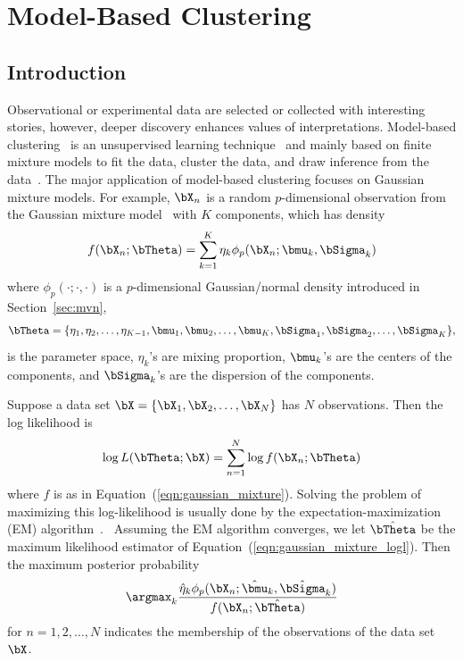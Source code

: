 
\chapter{Model-Based Clustering}
\label{chp:pmclust}




\section{Introduction}

Observational or experimental data are selected or collected with
interesting stories, however, deeper discovery enhances values of
interpretations.
Model-based clustering~
is an unsupervised learning technique~
and mainly based on finite mixture models to fit the data, cluster the data,
and draw inference from the data~\citep{Fraley2002,Melnykov2010}.
The major application of
model-based clustering focuses on Gaussian mixture models. For example,
$\bX_n$ is a random $p$-dimensional observation from
the Gaussian mixture model~
with $K$ components, which has density
\begin{equation}
f(\bX_n; \bTheta) = \sum_{k = 1}^K \eta_k \phi_p(\bX_n; \bmu_k, \bSigma_k)
\label{eqn:gaussian_mixture}
\end{equation}
where $\phi_p(\cdot;\cdot,\cdot)$ is a $p$-dimensional Gaussian/normal density
introduced in Section~\ref{sec:mvn},
$$
\bTheta = \{\eta_1, \eta_2, \ldots, \eta_{K-1},
\bmu_1, \bmu_2, \ldots, \bmu_K, \bSigma_1, \bSigma_2, \ldots, \bSigma_K\},
$$
is the parameter space,
$\eta_k$'s are mixing proportion, $\bmu_k$'s are the centers of the components,
and $\bSigma_k$'s are the dispersion of the components.

Suppose a data set $\bX = \{\bX_1, \bX_2, \ldots, \bX_N\}$ has
$N$ observations.  Then the log likelihood is
\begin{equation}
\log L(\bTheta; \bX) = \sum_{n = 1}^N \log f(\bX_n; \bTheta)
\label{eqn:gaussian_mixture_logl}
\end{equation}
where $f$ is as in Equation~(\ref{eqn:gaussian_mixture}).
Solving the problem of maximizing this log-likelihood is usually done by the
expectation-maximization (EM)
algorithm~\citep{Dempster1977}.~
Assuming the EM algorithm converges, we let $\hat{\bTheta}$ be the
maximum likelihood estimator of Equation~(\ref{eqn:gaussian_mixture_logl}).
Then the maximum posterior probability
$$
\argmax_k
\frac{\hat{\eta}_k\phi_p(\bX_n; \hat{\bmu}_k, \hat{\bSigma}_k)
    }{f(\bX_n; \hat{\bTheta})}
$$
for $n = 1, 2, \ldots, N$
indicates the membership of the observations of the data set $\bX$.


